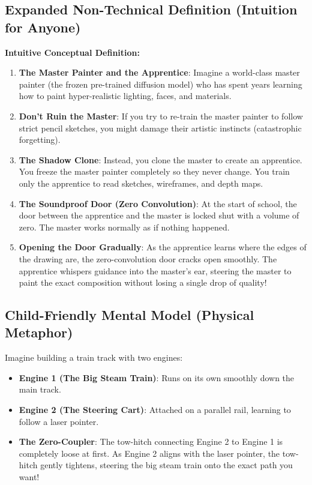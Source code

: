 \documentclass[11pt,a4paper]{article}
\theoremstyle{definition}
\begin{document}
\subsection{Expanded Non-Technical Definition (Intuition for Anyone)}
\textbf{Intuitive Conceptual Definition:}
\begin{enumerate}
    \item \textbf{The Master Painter and the Apprentice}: Imagine a world-class master painter (the frozen pre-trained diffusion model) who has spent years learning how to paint hyper-realistic lighting, faces, and materials.
    \item \textbf{Don't Ruin the Master}: If you try to re-train the master painter to follow strict pencil sketches, you might damage their artistic instincts (catastrophic forgetting).
    \item \textbf{The Shadow Clone}: Instead, you clone the master to create an apprentice. You freeze the master painter completely so they never change. You train only the apprentice to read sketches, wireframes, and depth maps.
    \item \textbf{The Soundproof Door (Zero Convolution)}: At the start of school, the door between the apprentice and the master is locked shut with a volume of zero. The master works normally as if nothing happened.
    \item \textbf{Opening the Door Gradually}: As the apprentice learns where the edges of the drawing are, the zero-convolution door cracks open smoothly. The apprentice whispers guidance into the master's ear, steering the master to paint the exact composition without losing a single drop of quality!
\end{enumerate}

\subsection{Child-Friendly Mental Model (Physical Metaphor)}
Imagine building a train track with two engines:
\begin{itemize}
    \item \textbf{Engine 1 (The Big Steam Train)}: Runs on its own smoothly down the main track.
    \item \textbf{Engine 2 (The Steering Cart)}: Attached on a parallel rail, learning to follow a laser pointer.
    \item \textbf{The Zero-Coupler}: The tow-hitch connecting Engine 2 to Engine 1 is completely loose at first. As Engine 2 aligns with the laser pointer, the tow-hitch gently tightens, steering the big steam train onto the exact path you want!
\end{itemize}
\end{document}

